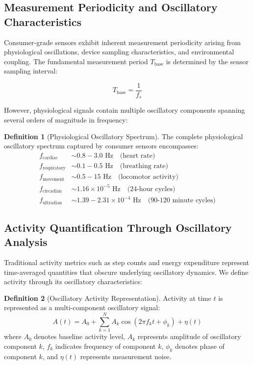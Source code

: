 \documentclass[12pt,a4paper]{article}
\theoremstyle{definition}
\newtheorem{definition}{Definition}[section]
\begin{document}
\subsection{Measurement Periodicity and Oscillatory Characteristics}

Consumer-grade sensors exhibit inherent measurement periodicity arising from physiological oscillations, device sampling characteristics, and environmental coupling. The fundamental measurement period $T_{\text{base}}$ is determined by the sensor sampling interval:

\begin{equation}
T_{\text{base}} = \frac{1}{f_s}
\end{equation}

However, physiological signals contain multiple oscillatory components spanning several orders of magnitude in frequency:

\begin{definition}[Physiological Oscillatory Spectrum]
The complete physiological oscillatory spectrum captured by consumer sensors encompasses:
\begin{align}
f_{\text{cardiac}} &\sim 0.8-3.0 \text{ Hz} \quad \text{(heart rate)} \\
f_{\text{respiratory}} &\sim 0.1-0.5 \text{ Hz} \quad \text{(breathing rate)} \\
f_{\text{movement}} &\sim 0.5-15 \text{ Hz} \quad \text{(locomotor activity)} \\
f_{\text{circadian}} &\sim 1.16 \times 10^{-5} \text{ Hz} \quad \text{(24-hour cycles)} \\
f_{\text{ultradian}} &\sim 1.39-2.31 \times 10^{-4} \text{ Hz} \quad \text{(90-120 minute cycles)}
\end{align}
\end{definition}

\subsection{Activity Quantification Through Oscillatory Analysis}

Traditional activity metrics such as step counts and energy expenditure represent time-averaged quantities that obscure underlying oscillatory dynamics. We define activity through its oscillatory characteristics:

\begin{definition}[Oscillatory Activity Representation]
Activity at time $t$ is represented as a multi-component oscillatory signal:
\begin{equation}
A(t) = A_0 + \sum_{k=1}^{N} A_k \cos(2\pi f_k t + \phi_k) + \eta(t)
\end{equation}
where $A_0$ denotes baseline activity level, $A_k$ represents amplitude of oscillatory component $k$, $f_k$ indicates frequency of component $k$, $\phi_k$ denotes phase of component $k$, and $\eta(t)$ represents measurement noise.
\end{definition}
\end{document}
